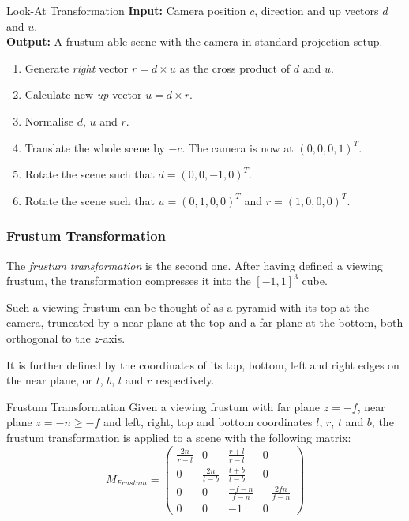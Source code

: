\documentclass{panikzettel}
\begin{document}
\begin{algo}{Look-At Transformation}
\textbf{Input:} Camera position $c$, direction and up vectors $d$ and $u$. \\
\textbf{Output:} A frustum-able scene with the camera in standard projection setup.
\tcblower
\begin{enumerate}
    \item Generate \emph{right} vector $r = d \times u$ as the cross product of $d$ and $u$.
    \item Calculate new \emph{up} vector $u = d \times r$.
    \item Normalise $d$, $u$ and $r$.
    \item Translate the whole scene by $-c$. The camera is now at $(0, 0, 0, 1)^T$.
    \item Rotate the scene such that $d = (0, 0, -1, 0)^T$.
    \item Rotate the scene such that $u = (0, 1, 0, 0)^T$ and $r = (1, 0, 0, 0)^T$.
\end{enumerate}
\end{algo}

\subsubsection*{Frustum Transformation}

\begin{halfboxl}
The \emph{frustum transformation} is the second one. After having defined a viewing frustum, the transformation compresses it into the $[-1,1]^3$ cube.

Such a viewing frustum can be thought of as a pyramid with its top at the camera, truncated by a near plane at the top and a far plane at the bottom, both orthogonal to the $z$-axis.

It is further defined by the coordinates of its top, bottom, left and right edges on the near plane, or $t$, $b$, $l$ and $r$ respectively.

\end{halfboxl}%
\begin{halfboxr}
\vspace{-\baselineskip}
\begin{defi}{Frustum Transformation}
Given a viewing frustum with far plane $z = -f$, near plane $z = -n \ge -f$ and left, right, top and bottom coordinates $l$, $r$, $t$ and $b$, the frustum transformation is applied to a scene with the following matrix:
$$M_{Frustum} = \begin{pmatrix}
\frac{2n}{r-l} & 0 & \frac{r+l}{r-l} & 0 \\
0 & \frac{2n}{t-b} & \frac{t+b}{t-b} & 0 \\
0 & 0 & \frac{-f-n}{f-n} & -\frac{2fn}{f-n} \\
0 & 0 & -1 & 0
\end{pmatrix}$$
\end{defi}
\end{halfboxr}
\end{document}
